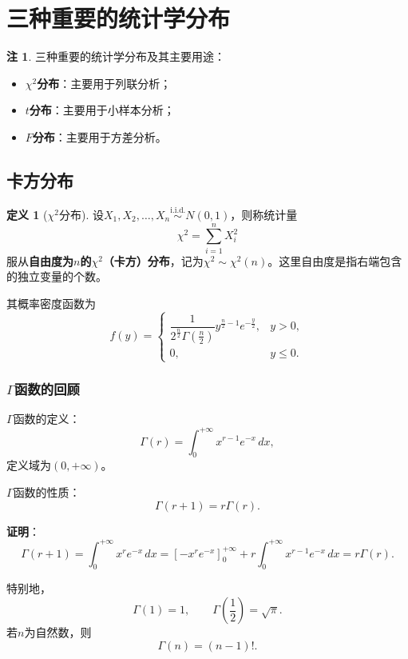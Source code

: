 \documentclass[11pt,a4paper]{report}
\theoremstyle{definition}
\newtheorem{definition}{定义}[chapter]
\newtheorem{note}{注}[chapter]
\begin{document}
\section{三种重要的统计学分布}

\begin{note}
三种重要的统计学分布及其主要用途：
\begin{itemize}[leftmargin=2em]
    \item \textbf{$\chi^{2}$分布}：主要用于列联分析；
    \item \textbf{$t$分布}：主要用于小样本分析；
    \item \textbf{$F$分布}：主要用于方差分析。
\end{itemize}
\end{note}

\subsection{卡方分布}

\begin{definition}[$\chi^{2}$分布]
设$X_{1},X_{2},\ldots,X_{n}\stackrel{\text{i.i.d.}}{\sim}N(0,1)$，则称统计量
\[
\chi^{2}=\sum_{i=1}^{n}X_{i}^{2}
\]
服从\textbf{自由度为$n$的$\chi^{2}$（卡方）分布}，记为$\chi^{2}\sim\chi^{2}(n)$。这里自由度是指右端包含的独立变量的个数。

其概率密度函数为
\[
f(y)=
\begin{cases}
\dfrac{1}{2^{\frac{n}{2}}\Gamma\left(\frac{n}{2}\right)}y^{\frac{n}{2}-1}e^{-\frac{y}{2}}, & y>0,\\[0.5em]
0, & y\leq 0.
\end{cases}
\]
\end{definition}

\subsubsection*{$\Gamma$函数的回顾}

$\Gamma$函数的定义：
\[
\Gamma(r)=\int_{0}^{+\infty}x^{r-1}e^{-x}\,dx,
\]
定义域为$(0,+\infty)$。

$\Gamma$函数的性质：
\[
\Gamma(r+1)=r\Gamma(r).
\]

\textbf{证明}：
\[
\Gamma(r+1)=\int_{0}^{+\infty}x^{r}e^{-x}\,dx=\left[-x^{r}e^{-x}\right]_{0}^{+\infty}+r\int_{0}^{+\infty}x^{r-1}e^{-x}\,dx=r\Gamma(r).
\]

特别地，
\[
\Gamma(1)=1,\qquad\Gamma\left(\frac{1}{2}\right)=\sqrt{\pi}.
\]
若$n$为自然数，则
\[
\Gamma(n)=(n-1)!.
\]
\end{document}
